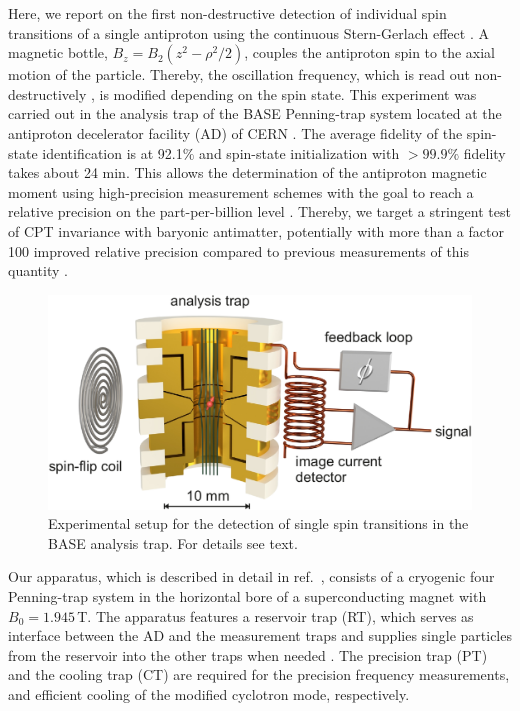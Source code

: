 \documentclass[12pt,preprint%
]{elsarticle}
\begin{document}
Here, we report on the first non-destructive detection of individual spin transitions of a single antiproton using the continuous Stern-Gerlach effect \cite{DehmeltCSGE}. A magnetic bottle, $B_z=B_2(z^2-\rho^2/2)$, couples the antiproton spin to the axial motion of the particle. Thereby, the oscillation frequency, which is read out non-destructively \cite{Wine}, is modified depending on the spin state. This experiment was carried out in the analysis trap of the BASE Penning-trap system located at the antiproton decelerator facility (AD) of CERN \cite{SmorraEPJST2015}. The average fidelity of the spin-state identification is at 92.1$\%$ and spin-state initialization with $>99.9\%$ fidelity takes about 24 min. This allows the determination of the antiproton magnetic moment using high-precision measurement schemes \cite{haeffner2003double,MooserPLB2013} with the goal to reach a relative precision on the part-per-billion level \cite{MooserNature2014}. Thereby, we target a stringent test of CPT invariance with baryonic antimatter, potentially with more than a factor 100 improved relative precision compared to previous measurements of this quantity \cite{Jack2013Antiproton,HiroNC2016}. %


\begin{figure}[htb]
        \centerline{\includegraphics[width=0.47 \textwidth,keepaspectratio]{FIG1SSF.pdf}}
            \caption[Filter]{Experimental setup for the detection of single spin transitions in the BASE analysis trap. For details see text.} 
						\label{fig1}
    \end{figure}


Our apparatus, which is described in detail in ref.~\cite{SmorraEPJST2015}, consists of a cryogenic four Penning-trap system in the horizontal bore of a superconducting magnet with $B_0 = 1.945\,$T. The apparatus features a reservoir trap (RT), which serves as interface between the AD and the measurement traps and supplies single particles from the reservoir into the other traps when needed \cite{SmorraIJMS2015}. The precision trap (PT) and the cooling trap (CT) are required for the precision frequency measurements, and efficient cooling of the modified cyclotron mode, respectively. 
\end{document}
